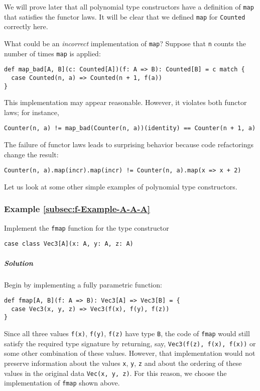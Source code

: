 We will prove later that all polynomial type constructors have a definition
of \lstinline!map! that satisfies the functor laws. It will be clear
that we defined \lstinline!map! for \lstinline!Counted! correctly
here. 

What could be an \emph{incorrect} implementation of \lstinline!map!?
Suppose that \lstinline!n! counts the number of times \lstinline!map!
is applied:
\begin{lstlisting}
def map_bad[A, B](c: Counted[A])(f: A => B): Counted[B] = c match {
  case Counted(n, a) => Counted(n + 1, f(a))
}
\end{lstlisting}
This implementation may appear reasonable. However, it violates both
functor laws; for instance,
\begin{lstlisting}
Counter(n, a) != map_bad(Counter(n, a))(identity) == Counter(n + 1, a)
\end{lstlisting}
The failure of functor laws leads to surprising behavior because code
refactorings change the result:
\begin{lstlisting}
Counter(n, a).map(incr).map(incr) != Counter(n, a).map(x => x + 2)
\end{lstlisting}

Let us look at some other simple examples of polynomial type constructors.

\subsubsection{Example \label{subsec:f-Example-A-A-A}\ref{subsec:f-Example-A-A-A}}

Implement the \lstinline!fmap! function for the type constructor
\begin{lstlisting}
case class Vec3[A](x: A, y: A, z: A)
\end{lstlisting}


\subparagraph{Solution}

Begin by implementing a fully parametric function:
\begin{lstlisting}
def fmap[A, B](f: A => B): Vec3[A] => Vec3[B] = {
  case Vec3(x, y, z) => Vec3(f(x), f(y), f(z))
}
\end{lstlisting}
Since all three values \lstinline!f(x)!, \lstinline!f(y)!, \lstinline!f(z)!
have type \lstinline!B!, the code of \lstinline!fmap! would still
satisfy the required type signature by returning, say, \lstinline!Vec3(f(z), f(x), f(x))!
or some other combination of these values. However, that implementation
would not preserve information about the values \lstinline!x!, \lstinline!y!,
\lstinline!z! and about the ordering of these values in the original
data \lstinline!Vec(x, y, z)!. For this reason, we choose the implementation
of \lstinline!fmap! shown above.

